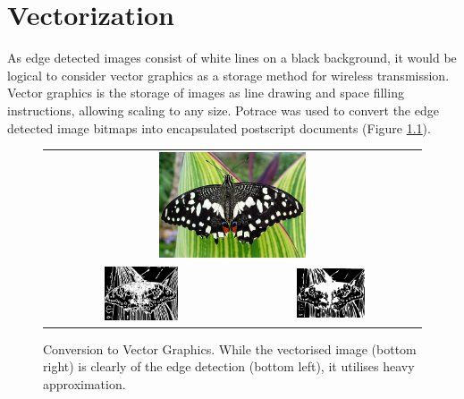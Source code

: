 \chapter{Vectorization}
\label{appendix:vectorization}

As edge detected images consist of white lines on a black background, it would be logical to consider vector graphics as a storage method for wireless transmission. Vector graphics is the storage of images as line drawing and space filling instructions, allowing scaling to any size. Potrace \cite{potrace} was used to convert the edge detected image bitmaps into encapsulated postscript documents (Figure \ref{fig:potrace}). 

\begin{figure}[H]
    \begin{center}
    \begin{tabular}{ c c }
        \multicolumn{2}{c}{\includegraphics[width=0.4\textwidth]{Figures/butterfly.jpg}} \\
        \includegraphics[width=0.4\textwidth]{Figures/butteredge.jpg} &
        \includegraphics[width=0.4\textwidth]{Figures/butter.eps}
    \end{tabular}
    \caption[Conversion to Vector Graphics]{Conversion to Vector Graphics. While the vectorised image (bottom right) is clearly of the edge detection (bottom left), it utilises heavy approximation.}
    \label{fig:potrace}
    \end{center}
\end{figure}

